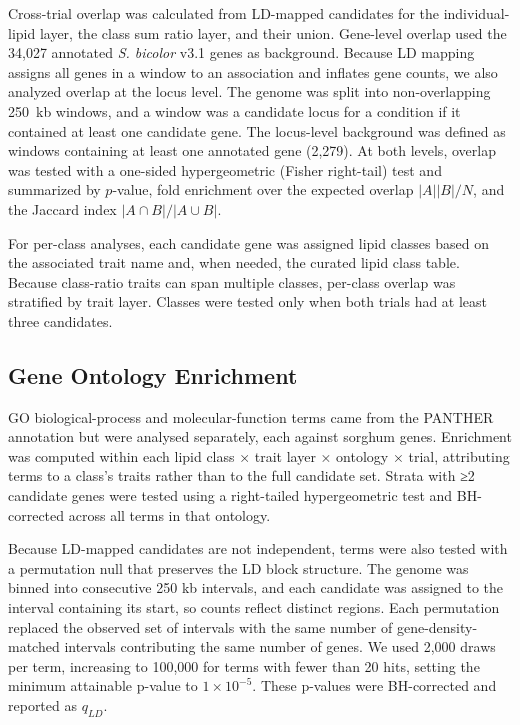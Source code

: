 \documentclass[9pt,twocolumn,twoside]{rilabRxiv}
\begin{document}
Cross-trial overlap was calculated from LD-mapped candidates for the individual-lipid layer, the class sum ratio layer, and their union. Gene-level overlap used the 34,027 annotated \textit{S. bicolor} v3.1 genes as background. Because LD mapping assigns all genes in a window to an association and inflates gene counts, we also analyzed overlap at the locus level. The genome was split into non-overlapping 250~kb windows, and a window was a candidate locus for a condition if it contained at least one candidate gene. The locus-level background was defined as windows containing at least one annotated gene (2,279). At both levels, overlap was tested with a one-sided hypergeometric (Fisher right-tail) test and summarized by $p$-value, fold enrichment over the expected overlap $|A||B|/N$, and the Jaccard index $|A\cap B|/|A\cup B|$.

For per-class analyses, each candidate gene was assigned lipid classes based on the associated trait name and, when needed, the curated lipid class table. Because class-ratio traits can span multiple classes, per-class overlap was stratified by trait layer. Classes were tested only when both trials had at least three candidates.

\subsection*{Gene Ontology Enrichment}

GO biological-process and molecular-function terms came from the PANTHER annotation but were analysed separately, each against sorghum genes. Enrichment was computed within each lipid class × trait layer × ontology × trial, attributing terms to a class’s traits rather than to the full candidate set. Strata with ≥2 candidate genes were tested using a right-tailed hypergeometric test and BH-corrected across all terms in that ontology.

Because LD-mapped candidates are not independent, terms were also tested with a permutation null that preserves the LD block structure. The genome was binned into consecutive 250 kb intervals, and each candidate was assigned to the interval containing its start, so counts reflect distinct regions. Each permutation replaced the observed set of intervals with the same number of gene-density-matched intervals contributing the same number of genes. We used 2,000 draws per term, increasing to 100,000 for terms with fewer than 20 hits, setting the minimum attainable p-value to $1\times10^{-5}$. These p-values were BH-corrected and reported as $q_{LD}$.
\end{document}
